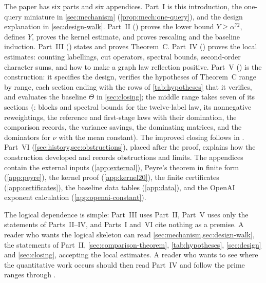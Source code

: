 The paper has six parts and six appendices. Part~I is this
introduction, the one-query miniature in \cref{sec:mechanism}
(\cref{prop:mech:one-query}), and the design explanation in
\cref{sec:design-walk}. Part~II
() proves the lower
bound $Y\ge\alpha^{72}$, defines $Y$, proves the kernel estimate,
and proves rescaling and the baseline induction. Part~III
() states
and proves Theorem~C. Part~IV
() proves the
local estimates: counting labellings, cut operators, spectral
bounds, second-order character sums, and how to make a graph law
reflection positive. Part~V () is the
construction: it specifies the design, verifies the hypotheses of
Theorem~C range by range, each section ending with the rows of
\cref{tab:hypotheses} that it verifies, and evaluates the baseline $\Theta$ in
\cref{sec:closing}; the middle range takes seven of its sections
(: blocks and
spectral bounds for the twelve-label law, its nonnegative
reweightings, the reference and first-stage laws with their
domination, the comparison records, the variance savings, the
dominating matrices, and the dominators for $\nu$ with the mean
constant). The improved closing follows in
.
Part~VI (\cref{sec:history,sec:obstructions}),
placed after the proof, explains how the construction developed and
records obstructions and limits. The appendices contain the
external inputs (\cref{app:external}), Peyre's theorem in finite
form (\cref{app:peyre}), the kernel proof (\cref{app:kernel20}),
the finite certificates (\cref{app:certificates}), the baseline
data tables (\cref{app:data}), and the OpenAI exponent calculation
(\cref{app:openai-constant}).

The logical dependence is simple: Part~III uses Part~II, Part~V uses
only the statements of Parts~II--IV, and Parts~I and~VI cite nothing as a
premise. A reader who wants the logical skeleton can read
\cref{sec:mechanism,sec:design-walk}, the statements of Part~II,
\cref{sec:comparison-theorem}, \cref{tab:hypotheses}, \cref{sec:design}
and \cref{sec:closing}, accepting the local estimates. A reader who wants
to see where the quantitative work occurs should then read Part~IV and
follow the prime ranges through
.
